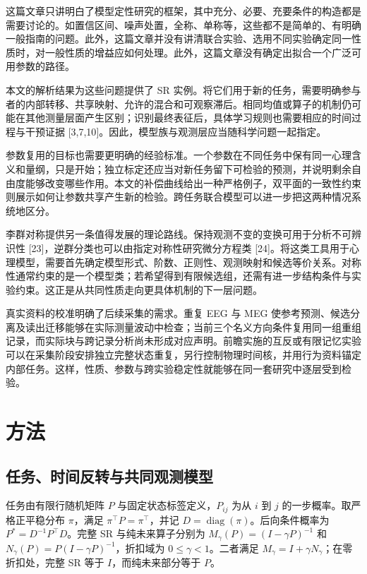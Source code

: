 \documentclass[11pt,a4paper]{article}
\begin{document}
这篇文章只讲明白了模型定性研究的框架，其中充分、必要、充要条件的构造都是需要讨论的。如置信区间、噪声处置，全称、单称等，这些都不是简单的、有明确一般指南的问题。此外，这篇文章并没有讲清联合实验、选用不同实验确定同一性质时，对一般性质的增益应如何处理。此外，这篇文章没有确定出拟合一个广泛可用参数的路径。

本文的解析结果为这些问题提供了 SR
实例。将它们用于新的任务，需要明确参与者的内部转移、共享映射、允许的混合和可观察滞后。相同均值或算子的机制仍可能在其他测量层面产生区别；识别最终表征后，具体学习规则也需要相应的时间过程与干预证据
{[}3,7,10{]}。因此，模型族与观测层应当随科学问题一起指定。

参数复用的目标也需要更明确的经验标准。一个参数在不同任务中保有同一心理含义和量纲，只是开始；独立标定还应当对新任务留下可检验的预测，并说明剩余自由度能够改变哪些作用。本文的补偿曲线给出一种严格例子，双平面的一致性约束则展示如何让参数共享产生新的检验。跨任务联合模型可以进一步把这两种情况系统地区分。

李群对称提供另一条值得发展的理论路线。保持观测不变的变换可用于分析不可辨识性
{[}23{]}，逆群分类也可以由指定对称性研究微分方程类
{[}24{]}。将这类工具用于心理模型，需要首先确定模型形式、阶数、正则性、观测映射和候选等价关系。对称性通常约束的是一个模型类；若希望得到有限候选组，还需有进一步结构条件与实验约束。这正是从共同性质走向更具体机制的下一层问题。

真实资料的校准明确了后续采集的需求。重复 EEG 与 MEG
使参考预测、候选分离及读出迁移能够在实际测量波动中检查；当前三个名义方向条件复用同一组重组记录，而实际块与跨记录分析尚未形成对应声明。前瞻实施的互反或有限记忆实验可以在采集阶段安排独立完整状态重复，另行控制物理时间核，并用行为资料锚定内部任务。这样，性质、参数与跨实验稳定性就能够在同一套研究中逐层受到检验。

\FloatBarrier


\section{方法}\label{ux65b9ux6cd5}

\subsection{任务、时间反转与共同观测模型}\label{ux4efbux52a1ux65f6ux95f4ux53cdux8f6cux4e0eux5171ux540cux89c2ux6d4bux6a21ux578b}

任务由有限行随机矩阵 \(P\) 与固定状态标签定义，\(P_{ij}\) 为从 \(i\) 到
\(j\) 的一步概率。取严格正平稳分布 \(\pi\)，满足
\(\pi^\top P=\pi^\top\)，并记
\(D=\operatorname{diag}(\pi)\)。后向条件概率为
\(P^*=D^{-1}P^\top D\)。完整 SR 与纯未来算子分别为
\(M_\gamma(P)=(I-\gamma P)^{-1}\) 和
\(N_\gamma(P)=P(I-\gamma P)^{-1}\)，折扣域为 \(0\leq\gamma<1\)。二者满足
\(M_\gamma=I+\gamma N_\gamma\)；在零折扣处，完整 SR 等于
\(I\)，而纯未来部分等于 \(P\)。
\end{document}

